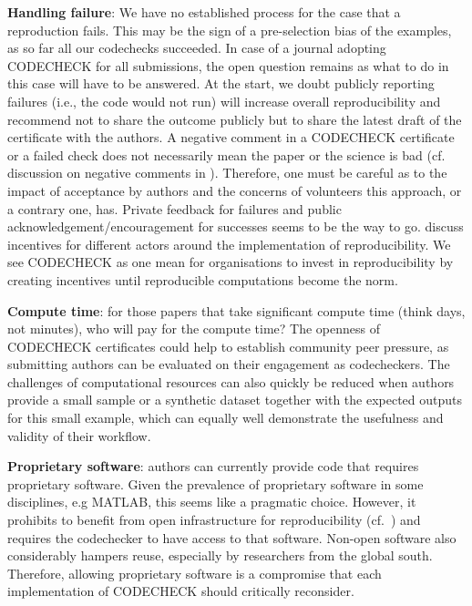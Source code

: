 \documentclass[12pt]{article}
\begin{document}
\textbf{Handling failure}: We have no established process for the case
that a reproduction fails. This may be the sign of a pre-selection bias
of the examples, as so far all our codechecks succeeded.
In case of a journal adopting CODECHECK for all submissions, the open 
question remains as what to do in this case will have to be answered.
At the start, we doubt publicly reporting failures (i.e., the code 
would not run) will increase overall reproducibility and recommend not
to share the outcome publicly but to share the latest draft of the 
certificate with the authors.
A negative comment in a CODECHECK certificate or a failed check does
not necessarily mean the paper or the science is bad
(cf. discussion on negative comments in \cite{everythinghertz123}).
Therefore, one must be careful as to the impact of acceptance by authors 
and the concerns of volunteers this approach, or a contrary one, has.
Private feedback for failures and public acknowledgement/encouragement
for successes seems to be the way to go.
\cite{Rosenthal2016b} discuss incentives for different actors around the
implementation of reproducibility. We see CODECHECK as one mean for
organisations to invest in reproducibility by creating incentives
until reproducible computations become the norm.

\textbf{Compute time}: for those papers that take significant compute
time (think days, not minutes), who will pay for the compute time?
The openness of CODECHECK certificates could help to establish community
peer pressure, as submitting authors can be evaluated on their engagement
as codecheckers.
The challenges of computational resources can also quickly be reduced when
authors provide a small sample or a synthetic dataset together with the
expected outputs for this small example, which can equally well demonstrate the 
usefulness and validity of their workflow.

\textbf{Proprietary software}: authors can currently provide code that requires
proprietary software. Given the prevalence of proprietary software in
some disciplines, e.g MATLAB, this seems like a pragmatic choice.
However, it prohibits to benefit from open infrastructure for reproducibility
(cf.~\cite{konkol_publishing_2020,perkel_make_2019})
and requires the codechecker to have access to that software.
Non-open software also considerably hampers reuse, especially by researchers
from the global south. Therefore, allowing proprietary software is a compromise
that each implementation of CODECHECK should critically reconsider.
\end{document}
